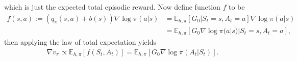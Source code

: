 \documentclass[a4paper]{article}
\begin{document}
which is just the expected total episodic reward.
%
Now define function $f$ to be
\begin{subequations}
\begin{align}
  f(s, a) := (q_{\pi}(s, a) + b(s))\nabla \log \pi(a | s) &= \mathbb{E}_{h,\pi} \left[ G_{0} | S_{t} = s, A_{t} = a \right] \nabla \log \pi(a | s) \\
  &= \mathbb{E}_{h,\pi} \left[ G_{0} \nabla \log \pi(a | s) | S_{t} = s, A_{t} = a \right] ,
\end{align}
\end{subequations}
then applying the law of total expectation yields
\begin{align}
  \nabla v_{\pi} \propto \mathbb{E}_{h,\pi}[f(S_{t}, A_{t})] =  \mathbb{E}_{h, \pi} \left[ G_{0} \nabla \log \pi(A_{t} | S_{t}) \right] .
\end{align}






\end{document}
